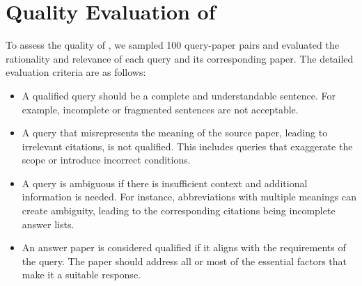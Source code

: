 
\section{Quality Evaluation of \autoS}\label{auto_eval}

To assess the quality of \autoS, we sampled 100 query-paper pairs and evaluated the rationality and relevance of each query and its corresponding paper. The detailed evaluation criteria are as follows:

\begin{itemize}
\item A qualified query should be a complete and understandable sentence. For example, incomplete or fragmented sentences are not acceptable.

\item A query that misrepresents the meaning of the source paper, leading to irrelevant citations, is not qualified. This includes queries that exaggerate the scope or introduce incorrect conditions.

\item A query is ambiguous if there is insufficient context and additional information is needed. For instance, abbreviations with multiple meanings can create ambiguity, leading to the corresponding citations being incomplete answer lists.

\item An answer paper is considered qualified if it aligns with the requirements of the query. The paper should address all or most of the essential factors that make it a suitable response. 
\end{itemize}

